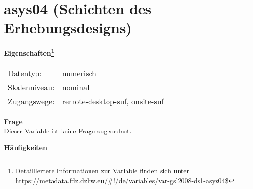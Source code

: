 
    \setcounter{footnote}{0}

    \vspace*{-1.8cm}
	\section{asys04 (Schichten des Erhebungsdesigns)}
	\label{section:asys04}



    \vspace*{0.5cm}
    \noindent\textbf{Eigenschaften\footnote{Detailliertere Informationen zur Variable finden sich unter
		\url{https://metadata.fdz.dzhw.eu/\#!/de/variables/var-gsl2008-ds1-asys04$}}}\\
	\begin{tabularx}{\hsize}{@{}lX}
	Datentyp: & numerisch \\
	Skalenniveau: & nominal \\
	Zugangswege: &
	  remote-desktop-suf, 
	  onsite-suf
 \\
    \end{tabularx}



		\vspace*{0.5cm}
		\noindent\textbf{Frage}\\
		Dieser Variable ist keine Frage zugeordnet.





        		\vspace*{0.5cm}
                \noindent\textbf{Häufigkeiten}

